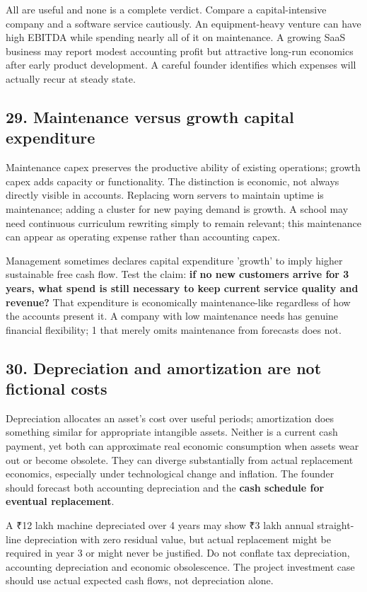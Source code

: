 All are useful and none is a complete verdict. Compare a capital-intensive company and a software service cautiously. An equipment-heavy venture can have high EBITDA while spending nearly all of it on maintenance. A growing SaaS business may report modest accounting profit but attractive long-run economics after early product development. A careful founder identifies which expenses will actually recur at steady state.

\subsection{29. Maintenance versus growth capital expenditure}


Maintenance capex preserves the productive ability of existing operations; growth capex adds capacity or functionality. The distinction is economic, not always directly visible in accounts. Replacing worn servers to maintain uptime is maintenance; adding a cluster for new paying demand is growth. A school may need continuous curriculum rewriting simply to remain relevant; this maintenance can appear as operating expense rather than accounting capex.

Management sometimes declares capital expenditure 'growth' to imply higher sustainable free cash flow. Test the claim: \textbf{if no new customers arrive for 3 years, what spend is still necessary to keep current service quality and revenue?} That expenditure is economically maintenance-like regardless of how the accounts present it. A company with low maintenance needs has genuine financial flexibility; 1 that merely omits maintenance from forecasts does not.

\subsection{30. Depreciation and amortization are not fictional costs}


Depreciation allocates an asset's cost over useful periods; amortization does something similar for appropriate intangible assets. Neither is a current cash payment, yet both can approximate real economic consumption when assets wear out or become obsolete. They can diverge substantially from actual replacement economics, especially under technological change and inflation. The founder should forecast both accounting depreciation and the \textbf{cash schedule for eventual replacement}.

A ₹12 lakh machine depreciated over 4 years may show ₹3 lakh annual straight-line depreciation with zero residual value, but actual replacement might be required in year 3 or might never be justified. Do not conflate tax depreciation, accounting depreciation and economic obsolescence. The project investment case should use actual expected cash flows, not depreciation alone.

